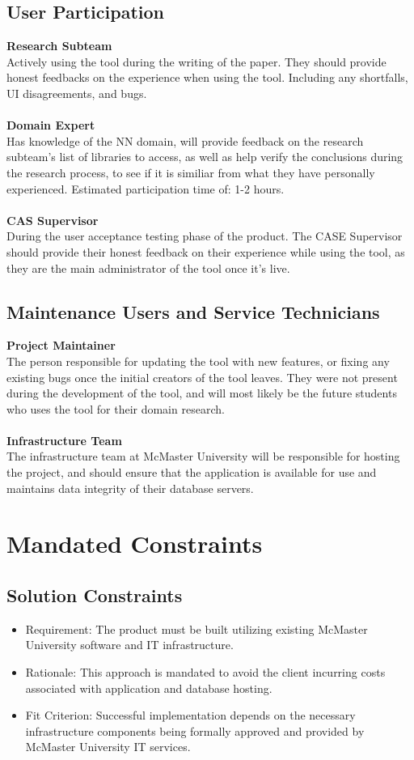 \documentclass[12pt]{article}
\begin{document}
\subsection{User Participation}
\textbf{Research Subteam} \\
Actively using the tool during the writing of the paper. They should provide honest feedbacks on the experience when using the tool. Including any shortfalls, UI disagreements, and bugs.\\\\
\textbf{Domain Expert} \\
Has knowledge of the NN domain, will provide feedback on the research subteam’s list of libraries to access, as well as help verify the conclusions during the research process, to see if it is similiar from what they have personally experienced. Estimated participation time of: 1-2 hours.
\\\\\textbf{CAS Supervisor} \\
During the user acceptance testing phase of the product. The CASE Supervisor should provide their honest feedback on their experience while using the tool, as they are the main administrator of the tool once it's live.

\subsection{Maintenance Users and Service Technicians}
\textbf{Project Maintainer} \\
The person responsible for updating the tool with new features, or fixing any existing bugs once the initial creators of the tool leaves. They were not present during the development of the tool, and will most likely be the future students who uses the tool for their domain research.
\\\\
\textbf{Infrastructure Team} \\
The infrastructure team at McMaster University will be responsible for hosting the project, and should ensure that the application is available for use and maintains data integrity of their database servers.
\section{Mandated Constraints}
\subsection{Solution Constraints}
\begin{itemize}
  \item Requirement: The product must be built utilizing existing McMaster University software and IT infrastructure.
  \item Rationale: This approach is mandated to avoid the client incurring costs associated with application and database hosting.
  \item Fit Criterion: Successful implementation depends on the necessary infrastructure components being formally approved and provided by McMaster University IT services.
\end{itemize}
\end{document}
